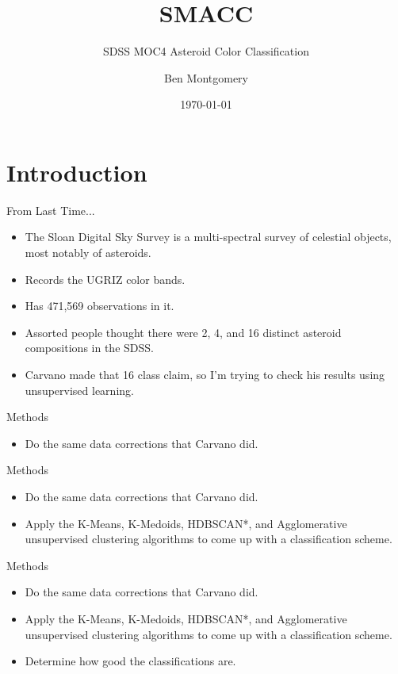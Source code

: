 \documentclass[10pt,xcolor={table,dvipsnames},t]{beamer}
\title[SMACC]{SMACC}
\subtitle{SDSS MOC4 Asteroid Color Classification}
\author{Ben Montgomery}
\institute{University of Southern Maine}
\date{\today}
\begin{document}
\begin{frame}
  \titlepage
\end{frame}

\section{Introduction}

\begin{frame}{From Last Time...}
\begin{itemize}
    \item The Sloan Digital Sky Survey is a multi-spectral survey of celestial objects, most notably of asteroids.
    \item Records the UGRIZ color bands.
    \item Has 471,569 observations in it.
    \item Assorted people thought there were 2, 4, and 16 distinct asteroid compositions in the SDSS.
    \item Carvano \cite{Carvano} made that 16 class claim, so I'm trying to check his results using unsupervised learning.
\end{itemize}
\end{frame}


\begin{frame}{Methods}
\begin{itemize}
    \item Do the same data corrections that Carvano did.
\end{itemize}
\end{frame}

\begin{frame}{Methods}
\begin{itemize}
    \item Do the same data corrections that Carvano did.
    \item Apply the K-Means, K-Medoids, HDBSCAN*, and Agglomerative unsupervised clustering algorithms to come up with a classification scheme.
\end{itemize}
\end{frame}

\begin{frame}{Methods}
\begin{itemize}
    \item Do the same data corrections that Carvano did.
    \item Apply the K-Means, K-Medoids, HDBSCAN*, and Agglomerative unsupervised clustering algorithms to come up with a classification scheme.
    \item Determine how good the classifications are.
\end{itemize}
\end{frame}
\end{document}
